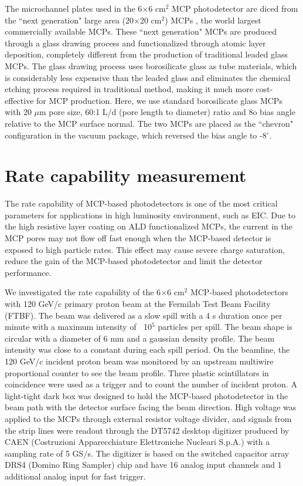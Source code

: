 \documentclass[preprint,5p]{elsarticle}
\begin{document}
The microchannel plates used in the 6$\times$6 cm$^2$ MCP photodetector are 
diced from the ``next generation" large area (20$\times$20 cm$^2$) MCPs 
\cite{LAPPD,Craven-MCPs}, the world largest commercially available MCPs. These 
``next generation" MCPs are produced through a glass drawing process and 
functionalized through atomic layer deposition, completely different from the 
production of traditional leaded glass MCPs. The glass drawing process uses 
borosilicate glass as tube materials, which is considerably less expensive than 
the leaded glass and eliminates the chemical etching process required in 
traditional method, making it much more cost-effective for MCP production.  
Here, we use standard borosilicate glass MCPs with 20 $\mu$m pore size, 60:1 
L/d (pore length to diameter) ratio and 8o bias angle relative to the MCP 
surface normal. The two MCPs are placed as the ``chevron" configuration in the 
vacuum package, which reversed the bias angle to -8$^{\circ}$. 


\section{Rate capability measurement} \label{sec_proton_measurements}
The rate capability of MCP-based photodetectors is one of the most critical 
parameters for applications in high luminosity environment, such as EIC. Due to 
the high resistive layer coating on ALD functionalized MCPs, the current in the 
MCP pores may not flow off fast enough when the MCP-based detector is exposed 
to high particle rates. This effect may cause severe charge saturation, reduce 
the gain of the MCP-based photodetector and limit the detector performance. 
 
We investigated the rate capability of the 6$\times$6 cm$^2$ MCP-based 
photodetectors with 120 GeV/c primary proton beam at the Fermilab Test Beam 
Facility (FTBF). The beam was delivered as a slow spill with a 4 s duration 
once per minute with a maximum intensity of $~$ 10$^5$ particles per spill.  
The beam shape is circular with a diameter of 6 mm and a gaussian density 
profile. The beam intensity was close to a constant during each spill period.  
On the beamline, the 120 GeV/c incident proton beam was monitored by an 
upstream multiwire proportional counter to see the beam profile. Three plastic 
scintillators in coincidence were used as a trigger and to count the number of 
incident proton. A light-tight dark box was designed to hold the MCP-based 
photodetector in the beam path with the detector surface facing the beam 
direction. High voltage was applied to the MCPs through external resistor 
voltage divider, and signals from the strip lines were readout through the 
DT5742 desktop digitizer \cite{Digitizer} produced by CAEN (Costruzioni 
Apparecchiature Elettroniche Nucleari S.p.A.) with a sampling rate of 5 GS/s.  
The digitizer is based on the switched capacitor array DRS4 (Domino Ring 
Sampler) chip \cite{DRS} and have 16 analog input channels and 1 additional 
analog input for fast trigger.
\end{document}
